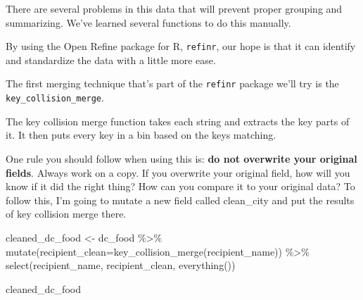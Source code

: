 \documentclass[
  letterpaper,
  DIV=11,
  numbers=noendperiod]{scrreprt}
\newenvironment{Shaded}{\begin{snugshade}}{\end{snugshade}}
\newcommand{\AttributeTok}[1]{\textcolor[rgb]{0.40,0.45,0.13}{#1}}
\newcommand{\FunctionTok}[1]{\textcolor[rgb]{0.28,0.35,0.67}{#1}}
\newcommand{\NormalTok}[1]{\textcolor[rgb]{0.00,0.23,0.31}{#1}}
\newcommand{\OtherTok}[1]{\textcolor[rgb]{0.00,0.23,0.31}{#1}}
\newcommand{\SpecialCharTok}[1]{\textcolor[rgb]{0.37,0.37,0.37}{#1}}
\begin{document}
There are several problems in this data that will prevent proper
grouping and summarizing. We've learned several functions to do this
manually.

By using the Open Refine package for R, \texttt{refinr}, our hope is
that it can identify and standardize the data with a little more ease.

The first merging technique that's part of the \texttt{refinr} package
we'll try is the \texttt{key\_collision\_merge}.

The key collision merge function takes each string and extracts the key
parts of it. It then puts every key in a bin based on the keys matching.

One rule you should follow when using this is: \textbf{do not overwrite
your original fields}. Always work on a copy. If you overwrite your
original field, how will you know if it did the right thing? How can you
compare it to your original data? To follow this, I'm going to mutate a
new field called clean\_city and put the results of key collision merge
there.

\begin{Shaded}
\begin{Highlighting}[]
\NormalTok{cleaned\_dc\_food }\OtherTok{\textless{}{-}}\NormalTok{ dc\_food }\SpecialCharTok{\%\textgreater{}\%}
  \FunctionTok{mutate}\NormalTok{(}\AttributeTok{recipient\_clean=}\FunctionTok{key\_collision\_merge}\NormalTok{(recipient\_name)) }\SpecialCharTok{\%\textgreater{}\%}
  \FunctionTok{select}\NormalTok{(recipient\_name, recipient\_clean, }\FunctionTok{everything}\NormalTok{())}

\NormalTok{cleaned\_dc\_food}
\end{Highlighting}
\end{Shaded}
\end{document}
